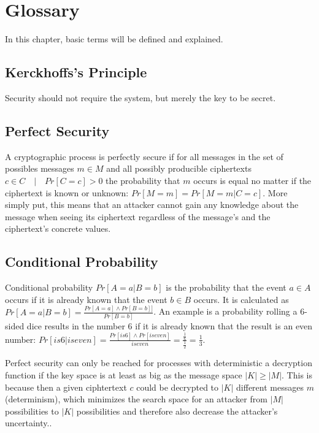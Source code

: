 \chapter{Glossary}

In this chapter, basic terms will be defined and explained.

\section{Kerckhoffs's Principle}

Security should not require the system, but merely the key to be secret.

\section{Perfect Security}
\label{sec:gloss:perf_sec}

A cryptographic process is perfectly secure if for all messages in the set of possibles messages $m \in M$ and all possibly producible ciphertexts $c \in C \quad|\quad Pr[C=c] > 0$ the probability that $m$ occurs is equal no matter if the ciphertext is known or unknown: $Pr[M=m] = Pr[M=m | C=c]$. More simply put, this means that an attacker cannot gain any knowledge about the message when seeing its ciphertext regardless of the message's and the ciphertext's concrete values.

\section{Conditional Probability}

Conditional probability $Pr[A=a | B=b]$ is the probability that the event $a \in A$ occurs if it is already known that the event $b \in B$ occurs. It is calculated as $Pr[A=a | B=b] = \frac{Pr[A=a] \wedge Pr[B=b]]}{Pr[B=b]}$. An example is a probability rolling a 6-sided dice results in the number 6 if it is already known that the result is an even number: $Pr[is 6 | is even] = \frac{Pr[is 6] \wedge Pr[is even]}{is even} = \frac{\frac{1}{6}}{\frac{1}{2}} = \frac{1}{3}$.

Perfect security can only be reached for processes with deterministic a decryption function if the key space is at least as big as the message space $|K| \geq |M|$. This is because then a given ciphtertext $c$ could be decrypted to $|K|$ different messages $m$ (determinism), which minimizes the search space for an attacker from $|M|$ possibilities to $|K|$ possibilities and therefore also decrease the attacker's uncertainty..

